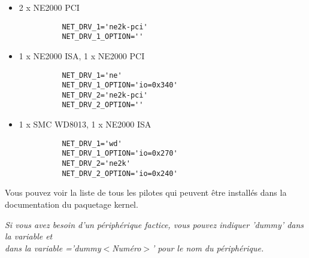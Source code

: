 \begin{description}
{\begin{itemize}
    \item 2 x NE2000 PCI
\begin{example}
\begin{verbatim}
          NET_DRV_1='ne2k-pci'
          NET_DRV_1_OPTION=''
\end{verbatim}
\end{example}
    \item  1 x NE2000 ISA, 1 x NE2000 PCI
\begin{example}
\begin{verbatim}
          NET_DRV_1='ne'
          NET_DRV_1_OPTION='io=0x340'
          NET_DRV_2='ne2k-pci'
          NET_DRV_2_OPTION=''
\end{verbatim}
\end{example}
    \item 1 x SMC WD8013, 1 x NE2000 ISA
\begin{example}
\begin{verbatim}
          NET_DRV_1='wd'
          NET_DRV_1_OPTION='io=0x270'
          NET_DRV_2='ne2k'
          NET_DRV_2_OPTION='io=0x240'
\end{verbatim}
\end{example}
    \end{itemize}

    Vous pouvez voir la liste de tous les pilotes qui peuvent être installés dans
    la documentation du paquetage kernel.

    \emph{Si vous avez besoin d'un périphérique factice, vous pouvez indiquer
    'dummy' dans la variable  et\\
    dans la variable ='dummy$<$Numéro$>$'
    pour le nom du périphérique.}

    }
\end{description}
